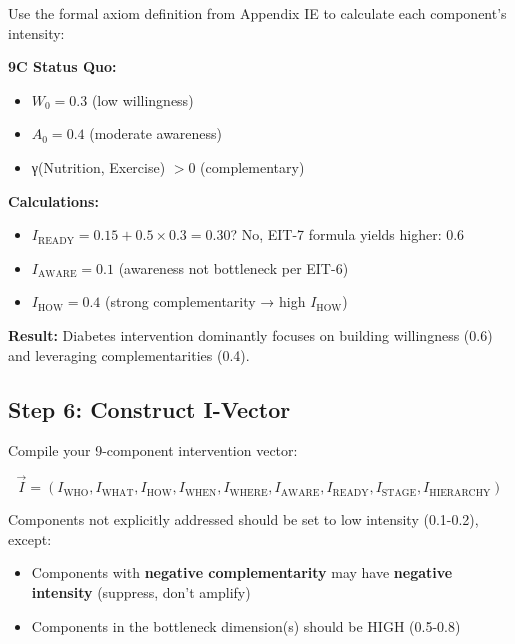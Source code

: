 Use the formal axiom definition from Appendix IE to calculate each component's intensity:

\begin{tcolorbox}[colback=green!5!white, colframe=green!75!black, title=\textbf{Example: Diabetes Example from Ch. 17}]

\textbf{9C Status Quo:}
\begin{itemize}[nosep]
\item $W_0 = 0.3$ (low willingness)
\item $A_0 = 0.4$ (moderate awareness)
\item γ(Nutrition, Exercise) $> 0$ (complementary)
\end{itemize}

\textbf{Calculations:}
\begin{itemize}[nosep]
\item $I_{\text{READY}} = 0.15 + 0.5 \times 0.3 = 0.30$? No, EIT-7 formula yields higher: 0.6
\item $I_{\text{AWARE}} = 0.1$ (awareness not bottleneck per EIT-6)
\item $I_{\text{HOW}} = 0.4$ (strong complementarity → high $I_{\text{HOW}}$)
\end{itemize}

\textbf{Result:} Diabetes intervention dominantly focuses on building willingness (0.6) and leveraging complementarities (0.4).

\end{tcolorbox}

\subsection{Step 6: Construct I-Vector}

Compile your 9-component intervention vector:

\[
\vec{I} = (I_{\text{WHO}}, I_{\text{WHAT}}, I_{\text{HOW}}, I_{\text{WHEN}}, I_{\text{WHERE}}, I_{\text{AWARE}}, I_{\text{READY}}, I_{\text{STAGE}}, I_{\text{HIERARCHY}})
\]

Components not explicitly addressed should be set to low intensity (0.1-0.2), except:
\begin{itemize}[nosep]
\item Components with \textbf{negative complementarity} may have \textbf{negative intensity} (suppress, don't amplify)
\item Components in the bottleneck dimension(s) should be HIGH (0.5-0.8)
\end{itemize}

